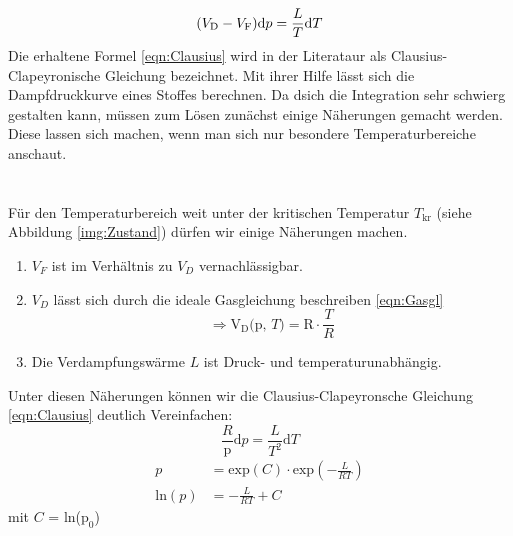 \begin{equation}
    (V_\text{D}-V_\text{F})\text{d}p =\frac{L}{T}\text{d}T\\
    \label{eqn:Clausius}
\end{equation}
Die erhaltene Formel \eqref{eqn:Clausius} wird in der Literataur als Clausius-Clapeyronische Gleichung bezeichnet. Mit ihrer Hilfe 
lässt sich die Dampfdruckkurve eines Stoffes berechnen. Da dsich die Integration sehr schwierg gestalten kann, müssen zum Lösen
zunächst einige Näherungen gemacht werden. Diese lassen sich machen, wenn man sich nur besondere Temperaturbereiche anschaut.
\\
\\
\\
Für den Temperaturbereich weit unter der kritischen Temperatur $T_\text{kr}$ (siehe Abbildung \ref{img:Zustand}) dürfen wir einige Näherungen machen.
\begin{enumerate}
    \item $V_F$ ist im Verhältnis zu $V_D$ vernachlässigbar.
    \item $V_D$ lässt sich durch die ideale Gasgleichung beschreiben \eqref{eqn:Gasgl}\\
            \begin{equation}
                \Rightarrow \text{V}_\text{D} \text{(p, }T\text{)} = \text{R}\cdot \frac{T}{R} \nonumber
            \end{equation}
    \item Die Verdampfungswärme $L$ ist Druck- und temperaturunabhängig.
\end{enumerate}
Unter diesen Näherungen können wir die Clausius-Clapeyronsche Gleichung \eqref{eqn:Clausius} deutlich Vereinfachen:
\begin{equation}
    \frac{R}{\text{p}}\text{d}p = \frac{L}{T^2}\text{d}T \nonumber
\end{equation}
\begin{align}
p &= \text{exp}(C)\cdot \text{exp}\left(-\frac{L}{RT}\right) \nonumber\\
\text{ln}(p)&= -\frac{L}{RT} + C \nonumber
\end{align}
mit $C$ = ln($\text{p}_0$)

